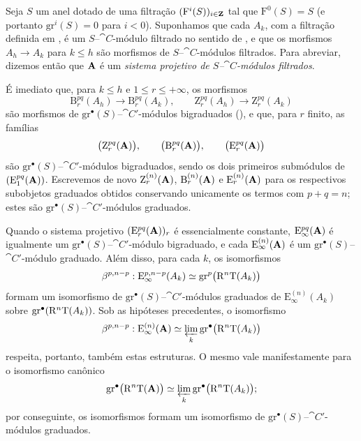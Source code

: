 \begin{env}[13.7.6]
\label{0.13.7.6}
Seja $S$ um anel dotado de uma filtração
$(\mathrm{F}^i(S))_{i\in\mathbf{Z}}$ tal que
$\mathrm{F}^0(S)=S$ (e portanto
$\mathrm{gr}^i(S)=0$ para $i<0$).
Suponhamos que cada $A_k$, com a filtração definida em
, é um
$S$--$\cat{C}$-módulo filtrado no sentido de , e que os
morfismos $A_h\longrightarrow A_k$ para $k\leq h$ são morfismos de
$S$--$\cat{C}$-módulos filtrados.
Para abreviar, dizemos então que $\mathbf{A}$ é um
\emph{sistema projetivo de $S$--$\cat{C}$-módulos filtrados}.

É imediato que, para $k\leq h$ e
$1\leq r\leq+\infty$, os morfismos
\[
  \mathrm{B}_r^{pq}(A_h)\longrightarrow\mathrm{B}_r^{pq}(A_k),
  \qquad
  \mathrm{Z}_r^{pq}(A_h)\longrightarrow\mathrm{Z}_r^{pq}(A_k)
\]
são morfismos de
$\mathrm{gr}^\bullet(S)$--$\cat{C}'$-módulos bigraduados
(), e que, para $r$ finito, as famílias
\[
  \bigl(\mathrm{Z}_r^{pq}(\mathbf{A})\bigr),\qquad
  \bigl(\mathrm{B}_r^{pq}(\mathbf{A})\bigr),\qquad
  \bigl(\mathrm{E}_r^{pq}(\mathbf{A})\bigr)
\]
são $\mathrm{gr}^\bullet(S)$--$\cat{C}'$-módulos
bigraduados, sendo os dois primeiros submódulos de
$(\mathrm{E}_1^{pq}(\mathbf{A}))$.
Escrevemos de novo
$\mathrm{Z}_r^{(n)}(\mathbf{A})$,
$\mathrm{B}_r^{(n)}(\mathbf{A})$ e
$\mathrm{E}_r^{(n)}(\mathbf{A})$ para os respectivos subobjetos graduados
obtidos conservando unicamente os termos com $p+q=n$; estes são
$\mathrm{gr}^\bullet(S)$--$\cat{C}'$-módulos graduados.

Quando o sistema projetivo
$(\mathrm{E}_r^{pq}(\mathbf{A}))_r$ é essencialmente constante,
$\mathrm{E}_\infty^{pq}(\mathbf{A})$ é igualmente um
$\mathrm{gr}^\bullet(S)$--$\cat{C}'$-módulo bigraduado, e cada
$\mathrm{E}_\infty^{(n)}(\mathbf{A})$ é um
$\mathrm{gr}^\bullet(S)$--$\cat{C}'$-módulo graduado.
Além disso, para cada $k$, os isomorfismos
\[
  \beta^{p,n-p}:
  \mathrm{E}_\infty^{p,n-p}(A_k)
  \simeq
  \mathrm{gr}^p\bigl(\mathrm{R}^n\mathrm{T}(A_k)\bigr)
\]
formam um isomorfismo de
$\mathrm{gr}^\bullet(S)$--$\cat{C}'$-módulos graduados de
$\mathrm{E}_\infty^{(n)}(A_k)$ sobre
$\mathrm{gr}^\bullet(\mathrm{R}^n\mathrm{T}(A_k))$.
Sob as hipóteses precedentes, o isomorfismo
\[
  \beta^{p,n-p}:
  \mathrm{E}_\infty^{(n)}(\mathbf{A})
  \simeq
  \varprojlim_k
  \mathrm{gr}^\bullet\bigl(\mathrm{R}^n\mathrm{T}(A_k)\bigr)
\]
respeita, portanto, também estas estruturas.
O mesmo vale manifestamente para o isomorfismo canônico
\[
  \mathrm{gr}^\bullet\bigl(\mathrm{R}^n\mathrm{T}(\mathbf{A})\bigr)
  \simeq
  \varprojlim_k
  \mathrm{gr}^\bullet\bigl(\mathrm{R}^n\mathrm{T}(A_k)\bigr);
\]
por conseguinte, os isomorfismos  formam um
isomorfismo de
$\mathrm{gr}^\bullet(S)$--$\cat{C}'$-módulos graduados.
\end{env}

